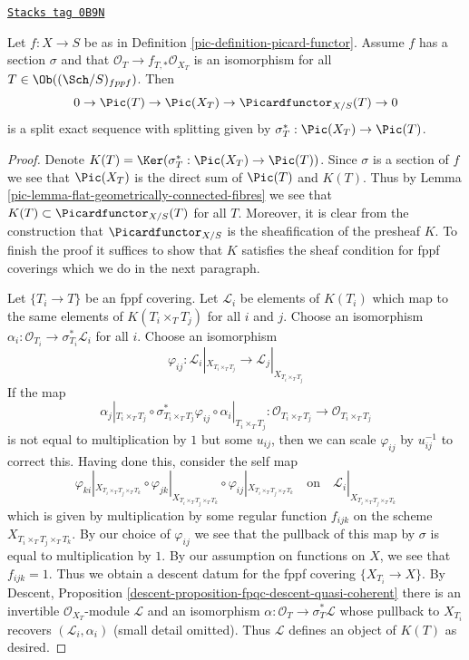\begin{lemma}
\label{pic-lemma-flat-geometrically-connected-fibres-with-section}
\href{https://stacks.math.columbia.edu/tag/0B9N}{\texttt{Stacks tag 0B9N}}

Let $f : X \to S$ be as in Definition \ref{pic-definition-picard-functor}.
Assume $f$ has a section $\sigma$ and that
$\mathcal{O}_T \to f_{T, *}\mathcal{O}_{X_T}$ is an isomorphism
for all $T \in \Ob((\Sch/S)_{fppf})$. Then
$$
0 \to \Pic(T) \to \Pic(X_T) \to \Picardfunctor_{X/S}(T) \to 0
$$
is a split exact sequence with splitting given by
$\sigma_T^* : \Pic(X_T) \to \Pic(T)$.
\end{lemma}

\begin{proof}

Denote $K(T) = \Ker(\sigma_T^* : \Pic(X_T) \to \Pic(T))$.
Since $\sigma$ is a section of $f$ we see that $\Pic(X_T)$ is the direct
sum of $\Pic(T)$ and $K(T)$.
Thus by Lemma \ref{pic-lemma-flat-geometrically-connected-fibres} we see that
$K(T) \subset \Picardfunctor_{X/S}(T)$ for all $T$. Moreover, it is clear
from the construction that $\Picardfunctor_{X/S}$ is the sheafification
of the presheaf $K$. To finish the proof it suffices to show that
$K$ satisfies the sheaf condition for fppf coverings which we do
in the next paragraph.

\medskip\noindent
Let $\{T_i \to T\}$ be an fppf covering. Let $\mathcal{L}_i$ be
elements of $K(T_i)$ which map to the same elements of $K(T_i \times_T T_j)$
for all $i$ and $j$. Choose an isomorphism
$\alpha_i : \mathcal{O}_{T_i} \to \sigma_{T_i}^*\mathcal{L}_i$
for all $i$. Choose an isomorphism
$$
\varphi_{ij} :
\mathcal{L}_i|_{X_{T_i \times_T T_j}}
\longrightarrow
\mathcal{L}_j|_{X_{T_i \times_T T_j}}
$$
If the map
$$
\alpha_j|_{T_i \times_T T_j} \circ
\sigma_{T_i \times_T T_j}^*\varphi_{ij} \circ
\alpha_i|_{T_i \times_T T_j} :
\mathcal{O}_{T_i \times_T T_j} \to \mathcal{O}_{T_i \times_T T_j}
$$
is not equal to multiplication by $1$ but some $u_{ij}$, then we can scale
$\varphi_{ij}$ by $u_{ij}^{-1}$ to correct this. Having done this, consider
the self map
$$
\varphi_{ki}|_{X_{T_i \times_T T_j \times_T T_k}} \circ
\varphi_{jk}|_{X_{T_i \times_T T_j \times_T T_k}} \circ
\varphi_{ij}|_{X_{T_i \times_T T_j \times_T T_k}}
\quad\text{on}\quad
\mathcal{L}_i|_{X_{T_i \times_T T_j \times_T T_k}}
$$
which is given by multiplication by some regular function $f_{ijk}$
on the scheme $X_{T_i \times_T T_j \times_T T_k}$.
By our choice of $\varphi_{ij}$ we see that the pullback of
this map by $\sigma$ is equal to multiplication by $1$. By
our assumption on functions on $X$, we see that $f_{ijk} = 1$.
Thus we obtain a descent datum for the fppf covering
$\{X_{T_i} \to X\}$. By
Descent, Proposition \ref{descent-proposition-fpqc-descent-quasi-coherent}
there is an invertible $\mathcal{O}_{X_T}$-module $\mathcal{L}$
and an isomorphism $\alpha : \mathcal{O}_T \to \sigma_T^*\mathcal{L}$
whose pullback to $X_{T_i}$ recovers $(\mathcal{L}_i, \alpha_i)$
(small detail omitted). Thus $\mathcal{L}$ defines an object
of $K(T)$ as desired.
\end{proof}

